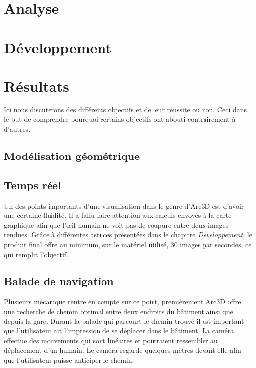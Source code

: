 \documentclass[a4paper,12pt,notitlepage]{report}
\begin{document}

\vspace*{\fill}

\vspace*{\fill}

\tableofcontents



\chapter{Analyse}



\chapter{Développement}







\chapter{Résultats}
Ici nous discuterons des différents objectifs et de leur réussite ou non. Ceci dans le but de comprendre pourquoi certains objectifs ont abouti contrairement à d'autres.

\section{Modélisation géométrique}


\section{Temps réel}
Un des points importants d'une visualisation dans le genre d'Arc3D est d'avoir une certaine fluidité. Il a fallu faire attention aux calculs envoyés à la carte graphique afin que l'œil humain ne voit pas de coupure entre deux images rendues. Grâce à différentes astuces présentées dans le chapitre \emph{Développement}, le produit final offre au minimum, sur le matériel utilisé, 30 images par secondes, ce qui remplit l'objectif.

\section{Balade de navigation}
Plusieurs mécanique rentre en compte sur ce point, premièrement Arc3D offre une recherche de chemin optimal entre deux endroits du bâtiment ainsi que depuis la gare.
Durant la balade qui parcourt le chemin trouvé il est important que l'utilisateur ait l'impression de se déplacer dans le bâtiment. La caméra effectue des mouvements qui sont linéaires et pourraient ressembler au déplacement d'un humain. Le caméra regarde quelques mètres devant elle afin que l'utilisateur puisse anticiper le chemin.
\end{document}
